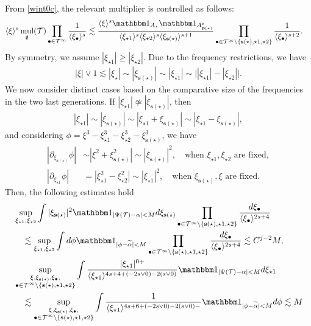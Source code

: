 \documentclass[%
11pt,  reqno]{amsart}
\newcommand{\5}{\textup{V}}
\newcommand{\ind}{\mathbbm 1}
\newcommand{\les}{\lesssim}
\newcommand{\wt}{\widetilde}
\theoremstyle{remark}
\newcommand{\bul}{\bullet}
\newcommand{\TT}{\mathcal{T}}
\newcommand{\al}{\alpha}
\newcommand{\gfrak}{\mathfrak{g}}
\newcommand{\pb}{\mathbf{p}}
\newcommand{\sbf}{\mathbf{s}}
\newcommand{\jb}[1]
{\langle #1 \rangle}
\DeclareMathOperator{\mul}{mul}
\numberwithin{equation}{section}
\numberwithin{theorem}{section}
\begin{document}
From \eqref{wint0c}, the relevant multiplier is controlled as follows:
\begin{align}\label{L22}
\jb{\xi}^s \mul_\gfrak(\TT) \prod_{\bul \in \TT^\infty} \frac{1}{\jb{\xi_\bul}^s}
&
\les \frac{\jb{\xi}^s \ind_{A_\star} \ind_{A^c_{\pb(\star)}} }{ \jb{\xi_{\star1}}^s \jb{\xi_{\star2}}^s  \jb{\xi_{\sbf(\star)}}^{s+1} } \prod_{\bul \in \TT^{\infty}\setminus \{\sbf(\star), \star1, \star2\}} \frac{1}{\jb{\xi_{\bul}}^{s+2}} 
. 
\end{align}
By symmetry, we assume $|\xi_{\star1}| \ge |\xi_{\star2}|$. Due to the frequency restrictions, we have
\begin{align}
|\xi| \lor 1 
 \les |\xi_{\star}| \sim |\xi_{\sbf(\star)}| 
\sim 
|\xi_{\star1}| 
\sim 
\big| |\xi_{\star1} | - |\xi_{\star2}| \big| 
.
\end{align}
We now consider distinct cases based on the comparative size of the frequencies in the two last generations. 
If $|\xi_{\star1}| \not\simeq |\xi_{\sbf(\star)}|$, then
\begin{align}
|\xi_{\star1}| \sim |\xi_{\sbf(\star)}| \sim | \xi_{\star1} + \xi_{\sbf(\star)}| \sim |\xi_{\star1} - \xi_{\sbf(\star)}|, 
\end{align}
and considering $\phi = \xi^3 - \xi^3_{\star1} - \xi_{\star2}^3 - \xi^3_{\sbf(\star)}$, we have
\begin{align}
| \partial_{\xi_{\sbf(\star)}} \phi |
&
\sim |\xi^2 + \xi_{\sbf(\star)}^2| \sim |\xi_{\sbf(\star)}|^2 
, 
\quad 
\text{when $\xi_{\star1}, \xi_{\star2}$ are fixed}, 
\\
 |\partial_{\xi_{\star1}} \phi |
&
= 
|\xi_{\star1}^2 - \xi_{\star2}^2|
\sim 
|\xi_{\star1}|^2 
, 
\quad 
\text{when $\xi_{\sbf(\star)}, \xi$ are fixed}.
\end{align}
Then, the following estimates hold
\begin{align}
& 
\sup_{\xi_{\star1}, \xi_{\star2}} \int |\xi_{\sbf(\star)}|^{2} \ind_{|\Psi(\TT) - \al | < M} 
 d\xi_{\sbf(\star)}\prod_{\bul \in \TT^\infty\setminus\{ \sbf(\star), \star1, \star2 \}} \frac{d\xi_\bul }{\jb{\xi_\bul}^{2s+4}} 
\\
&
\quad 
\les 
\sup_{\xi_{\star1}, \xi_{\star2}} \int
d\phi  \ind_{|\phi - \wt\al | < M} \prod_{\bul \in \TT^\infty\setminus\{ \sbf(\star), \star1, \star2 \}} \frac{d\xi_\bul }{\jb{\xi_\bul}^{2s+4}} 
\les C^{j-2} M,
\\
&
\sup_{\substack{\xi, \xi_{\sbf(\star)}, \xi_\bul,
\\ \bul \in \TT^\infty\setminus\{\sbf(\star), \star1, \star2 \}}} 
\int
\frac{|\xi_{\star1}|^{0+}}{\jb{\xi_{\star1}}^{4s+4 + (-2s\lor 0) -2 (s\lor 0)}} \ind_{|\Psi(\TT) - \al| < M} d\xi_{\star1} 
\\
&
\quad 
\les 
\sup_{\substack{\xi, \xi_{\sbf(\star)}, \xi_\bul,
\\ \bul \in \TT^\infty\setminus\{\sbf(\star), \star1, \star2 \}}} 
\int
\frac{1}{\jb{\xi_{\star1}}^{4s+6 + (-2s\lor 0) -2 (s\lor 0) - }  } \ind_{| \phi  - \wt\al | < M} d\phi 
\les M
\end{align}
\end{document}

